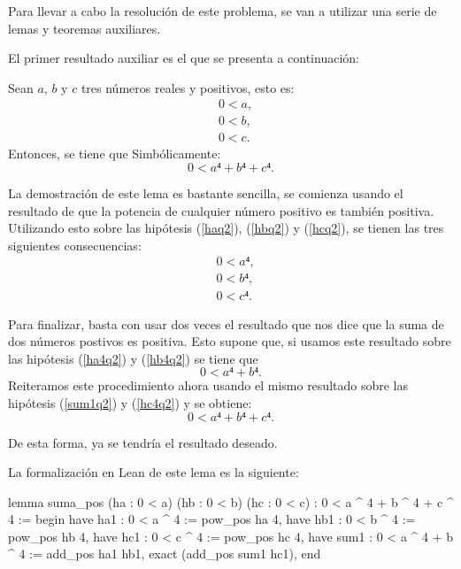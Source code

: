 Para llevar a cabo la resolución de este problema, se van a utilizar
una serie de lemas y teoremas auxiliares.

El primer resultado auxiliar es el que se presenta a continuación:

\begin{lema}\label{lemasuma}
  Sean \(a\), \(b\) y \(c\) tres números reales y positivos, esto es:
  \begin{align}
    &0 < a, \label{haq2}\tag{ha}\\
    &0 < b, \label{hbq2}\tag{hb}\\
    &0 < c. \label{hcq2}\tag{hc}
  \end{align}
  Entonces, se tiene que
  Simbólicamente:
  \begin{equation}
    0 < a⁴+b⁴+c⁴.
  \end{equation}
\end{lema}

\begin{demostracion}
  La demostración de este lema es bastante sencilla, se comienza usando
  el resultado de que la potencia de cualquier número positivo es
  también positiva. Utilizando esto sobre las hipótesis (\ref{haq2}),
  (\ref{hbq2}) y (\ref{hcq2}), se tienen las tres siguientes
  consecuencias:
  \begin{align}
    &0 < a⁴, \label{ha4q2}\tag{ha1}\\
    &0 < b⁴, \label{hb4q2}\tag{hb1}\\
    &0 < c⁴. \label{hc4q2}\tag{hc1}
  \end{align}

  Para finalizar, basta con usar dos veces el resultado que nos dice que
  la suma de dos números postivos es positiva. Esto supone que, si
  usamos este resultado sobre las hipótesis (\ref{ha4q2}) y
  (\ref{hb4q2}) se tiene que
  \begin{equation}\label{sum1q2}\tag{sum1}
    0 < a⁴+b⁴.
  \end{equation}
  Reiteramos este procedimiento ahora usando el mismo resultado sobre
  las hipótesis (\ref{sum1q2}) y (\ref{hc4q2}) y se obtiene:
  \begin{equation}\tag{sum2}
    0 < a⁴+b⁴+c⁴.
  \end{equation}

  De esta forma, ya se tendría el resultado deseado.
\end{demostracion}

La formalización en Lean de este lema es la siguiente:
\begin{leancode}
lemma suma_pos
  (ha : 0 < a)
  (hb : 0 < b)
  (hc : 0 < c)
  : 0 < a ^ 4 + b ^ 4 + c ^ 4 :=
begin
  have ha1 : 0 < a ^ 4          := pow_pos ha 4,
  have hb1 : 0 < b ^ 4          := pow_pos hb 4,
  have hc1 : 0 < c ^ 4          := pow_pos hc 4,
  have sum1 : 0 < a ^ 4 + b ^ 4 := add_pos ha1 hb1,
  exact (add_pos sum1 hc1),
end
\end{leancode}

